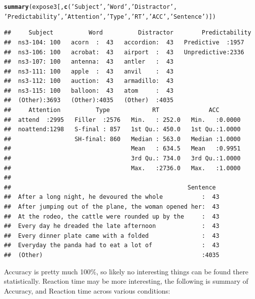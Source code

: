 \documentclass[11pt]{article}\usepackage[]{graphicx}\usepackage[]{color}
\makeatletter
\newcommand{\hlstr}[1]{\textcolor[rgb]{0.192,0.494,0.8}{#1}}%
\newcommand{\hlstd}[1]{\textcolor[rgb]{0.345,0.345,0.345}{#1}}%
\newcommand{\hlkwd}[1]{\textcolor[rgb]{0.737,0.353,0.396}{\textbf{#1}}}%
\newenvironment{kframe}{%
 \def\at@end@of@kframe{}%
 \ifinner\ifhmode%
  \def\at@end@of@kframe{\end{minipage}}%
  \begin{minipage}{\columnwidth}%
 \fi\fi%
 \def\FrameCommand##1{\hskip\@totalleftmargin \hskip-\fboxsep
 \colorbox{shadecolor}{##1}\hskip-\fboxsep
     \hskip-\linewidth \hskip-\@totalleftmargin \hskip\columnwidth}%
 \MakeFramed {\advance\hsize-\width
   \@totalleftmargin\z@ \linewidth\hsize
   \@setminipage}}%
 {\par\unskip\endMakeFramed%
 \at@end@of@kframe}
\newenvironment{knitrout}{}{} %
\makeatother
\begin{document}
\begin{knitrout}\footnotesize
{}\color{fgcolor}\begin{kframe}
\begin{alltt}
 \hlkwd{summary}\hlstd{(expose3[,}\hlkwd{c}\hlstd{(}\hlstr{'Subject'}\hlstd{,} \hlstr{'Word'}\hlstd{,} \hlstr{'Distractor'}\hlstd{,}
 \hlstr{'Predictability'}\hlstd{,} \hlstr{'Attention'}\hlstd{,} \hlstr{'Type'}\hlstd{,} \hlstr{'RT'}\hlstd{,} \hlstr{'ACC'}\hlstd{,} \hlstr{'Sentence'}\hlstd{)])}
\end{alltt}
\begin{verbatim}
##     Subject          Word          Distractor        Predictability
##  ns3-104: 100   acorn  :  43   accordion:  43   Predictive  :1957  
##  ns3-106: 100   acrobat:  43   airport  :  43   Unpredictive:2336  
##  ns3-107: 100   antenna:  43   antler   :  43                      
##  ns3-111: 100   apple  :  43   anvil    :  43                      
##  ns3-112: 100   auction:  43   armadillo:  43                      
##  ns3-115: 100   balloon:  43   atom     :  43                      
##  (Other):3693   (Other):4035   (Other)  :4035                      
##     Attention          Type            RT              ACC        
##  attend  :2995   Filler  :2576   Min.   : 252.0   Min.   :0.0000  
##  noattend:1298   S-final : 857   1st Qu.: 450.0   1st Qu.:1.0000  
##                  SH-final: 860   Median : 563.0   Median :1.0000  
##                                  Mean   : 634.5   Mean   :0.9951  
##                                  3rd Qu.: 734.0   3rd Qu.:1.0000  
##                                  Max.   :2736.0   Max.   :1.0000  
##                                                                   
##                                                  Sentence   
##  After a long night, he devoured the whole           :  43  
##  After jumping out of the plane, the woman opened her:  43  
##  At the rodeo, the cattle were rounded up by the     :  43  
##  Every day he dreaded the late afternoon             :  43  
##  Every dinner plate came with a folded               :  43  
##  Everyday the panda had to eat a lot of              :  43  
##  (Other)                                             :4035
\end{verbatim}
\end{kframe}
\end{knitrout}

Accuracy is pretty much 100\%, so likely no interesting things can be found there statistically.  Reaction time may be more interesting, the following is summary of Accuracy, and Reaction time across various conditions:
\end{document}
